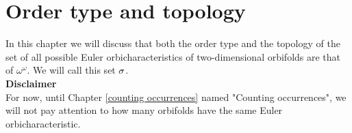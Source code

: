 \chapter{Order type and topology}\label{order structure}
%
%
%
In this chapter we will discuss that both the order type and the topology 
of the set of all possible Euler orbicharacteristics 
of two-dimensional orbifolds are that of $\omega^\omega$. We will call this set ${\sigma}$.
\\[4pt]
\textbf{Disclaimer}\\
For now, until Chapter \ref{counting occurrences} named "Counting occurrences", 
we will not pay attention 
to how many orbifolds have the same Euler orbicharacteristic. 


